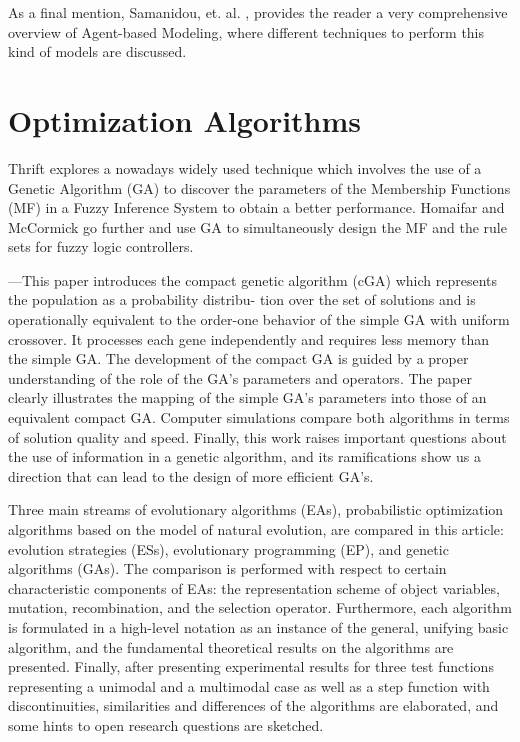 As a final mention, Samanidou, et. al. \cite{Samanidou_2007}, provides the
reader a very comprehensive overview of Agent-based Modeling, where different
techniques to perform this kind of models are discussed.

\section{Optimization Algorithms}
\label{section:optimization-algorithms}

Thrift \cite{Thrift1991} explores a nowadays widely used technique which
involves the use of a Genetic Algorithm (GA) to discover the parameters of the
Membership Functions (MF) in a Fuzzy Inference System to obtain a better
performance. Homaifar and McCormick \cite{Homaifar1995} go further and use GA to
simultaneously design the MF and the rule sets for fuzzy logic controllers.


\cite{Harik1999} —This paper introduces the compact genetic algorithm
(cGA) which represents the population as a probability distribu- tion over the
set of solutions and is operationally equivalent to the order-one behavior of
the simple GA with uniform crossover. It processes each gene independently and
requires less memory than the simple GA. The development of the compact GA is
guided by a proper understanding of the role of the GA’s parameters and
operators. The paper clearly illustrates the mapping of the simple GA’s
parameters into those of an equivalent compact GA. Computer simulations compare
both algorithms in terms of solution quality and speed. Finally, this work
raises important questions about the use of information in a genetic algorithm,
and its ramifications show us a direction that can lead to the design of more
efficient GA’s.

\cite{Back2008} Three main streams of evolutionary algorithms (EAs),
probabilistic optimization algorithms based on the model of natural evolution,
are compared in this article: evolution strategies (ESs), evolutionary
programming (EP), and genetic algorithms (GAs). The comparison is performed with
respect to certain characteristic components of EAs: the representation scheme
of object variables, mutation, recombination, and the selection
operator. Furthermore, each algorithm is formulated in a high-level notation as
an instance of the general, unifying basic algorithm, and the fundamental
theoretical results on the algorithms are presented. Finally, after presenting
experimental results for three test functions representing a unimodal and a
multimodal case as well as a step function with discontinuities, similarities
and differences of the algorithms are elaborated, and some hints to open
research questions are sketched.

